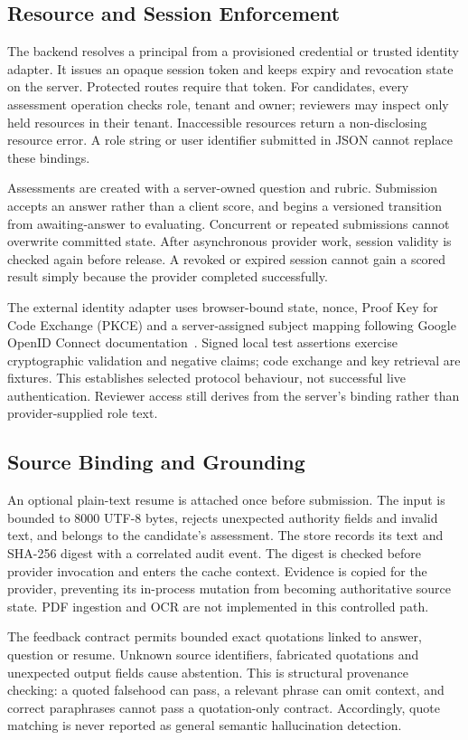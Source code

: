 \documentclass[conference]{IEEEtran}
\begin{document}
\subsection{Resource and Session Enforcement}
The backend resolves a principal from a provisioned credential or trusted identity adapter. It issues an opaque session token and keeps expiry and revocation state on the server. Protected routes require that token. For candidates, every assessment operation checks role, tenant and owner; reviewers may inspect only held resources in their tenant. Inaccessible resources return a non-disclosing resource error. A role string or user identifier submitted in JSON cannot replace these bindings.

Assessments are created with a server-owned question and rubric. Submission accepts an answer rather than a client score, and begins a versioned transition from awaiting-answer to evaluating. Concurrent or repeated submissions cannot overwrite committed state. After asynchronous provider work, session validity is checked again before release. A revoked or expired session cannot gain a scored result simply because the provider completed successfully.

The external identity adapter uses browser-bound state, nonce, Proof Key for Code Exchange (PKCE) and a server-assigned subject mapping following Google OpenID Connect documentation~\cite{google_oidc}. Signed local test assertions exercise cryptographic validation and negative claims; code exchange and key retrieval are fixtures. This establishes selected protocol behaviour, not successful live authentication. Reviewer access still derives from the server's binding rather than provider-supplied role text.

\subsection{Source Binding and Grounding}
An optional plain-text resume is attached once before submission. The input is bounded to 8000 UTF-8 bytes, rejects unexpected authority fields and invalid text, and belongs to the candidate's assessment. The store records its text and SHA-256 digest with a correlated audit event. The digest is checked before provider invocation and enters the cache context. Evidence is copied for the provider, preventing its in-process mutation from becoming authoritative source state. PDF ingestion and OCR are not implemented in this controlled path.

The feedback contract permits bounded exact quotations linked to answer, question or resume. Unknown source identifiers, fabricated quotations and unexpected output fields cause abstention. This is structural provenance checking: a quoted falsehood can pass, a relevant phrase can omit context, and correct paraphrases cannot pass a quotation-only contract. Accordingly, quote matching is never reported as general semantic hallucination detection.
\end{document}
